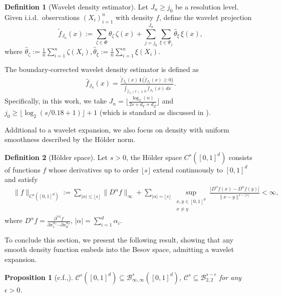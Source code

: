 \documentclass{article}
\theoremstyle{plain}
\newtheorem{proposition}{Proposition}[section]
\theoremstyle{definition}
\newtheorem{definition}{Definition}[section]
\def\calC{\mathcal{C}}
\theoremstyle{plain}
\def\calC{\mathcal{C}}
\begin{document}
\begin{definition}[Wavelet density estimator]\label{defi:wavelet.density.estimator}
Let $J_n \ge j_0$ be a resolution level. Given i.i.d.~observations $(X_i)_{i=1}^n$ with density $f$, define the wavelet projection
\[
\widetilde f_{J_n}(x)
:=
\sum_{\zeta\in\Phi}\widehat \theta_\zeta\,\zeta(x)
+
\sum_{j=j_0}^{J_n}\sum_{\xi\in\Psi_j}\widehat \theta_\xi\,\xi(x),
\]
where $\widehat\theta_{\zeta}
:=
\frac{1}{n}\sum_{i=1}^n
\zeta(X_i), \widehat\theta_{\xi}
:=
\frac{1}{n}\sum_{i=1}^n
\xi(X_i).
$

The boundary-corrected wavelet density estimator is defined as
\begin{align}\label{eq:wavelet.estimator}
\widehat f_{J_n}(x)
=
\frac{\widetilde f_{J_n}(x)\,\mathbf 1\{\widetilde f_{J_n}(x)\ge 0\}}
{\int_{\widetilde f_{J_n}(x)\ge 0}\widetilde f_{J_n}(x)\,dx}.
\end{align}
Specifically, in this work, we take $J_n = \lfloor \frac{\log_2(n)}{2s + d_Y + d_Z}\rfloor$ and $j_0 \geq \lfloor\log_2(s/0.18 + 1)\rfloor + 1$ (which is standard as discussed in \cite[Section A.2]{manole2024plugin}).
\end{definition}

Additional to a wavelet expansion, we also focus on density with uniform smoothness described by the H\"older norm.
\begin{definition}[H\"older space]\label{defi:Holder.space}
Let $s > 0$, the H\"older space $C^s([0,1]^d)$ consists of
functions $f$ whose derivatives up to order $\lfloor s \rfloor$
extend continuously to $[0,1]^d$ and satisfy
\begin{align*}
&\|f\|_{C^s([0,1]^d)}
:=
\sum_{|\alpha|\le \lfloor s \rfloor}\!
\|D^\alpha f\|_\infty +
\sum_{|\alpha|=\lfloor s \rfloor}
\sup_{\substack{x,y\in[0,1]^d\\ x\ne y}}
\frac{|D^\alpha f(x)-D^\alpha f(y)|}
{\|x-y\|^{s-\lfloor s \rfloor}}
<\infty,
\end{align*}
where $
D^\alpha f
=
\frac{\partial^{|\alpha|} f}
{\partial x_1^{\alpha_1}\cdots \partial x_d^{\alpha_d}}$, $|\alpha|=\sum_{i=1}^d \alpha_i$.
\end{definition}


To conclude this section, we present the following result, showing that any smooth density function embeds into the Besov space, admitting a wavelet expansion.
\begin{proposition}[{c.f.,\cite[Lemma 25]{manole2024plugin}}]\label{prop:embedding}
    $\calC^s([0,1]^d) \subseteq \mathcal{B}^s_{\infty,\infty}([0,1]^{d})$, $\calC^s \subseteq \mathcal{B}^{s - \epsilon}_{2,2}$ for any $\epsilon > 0$.
\end{proposition}
\end{document}

